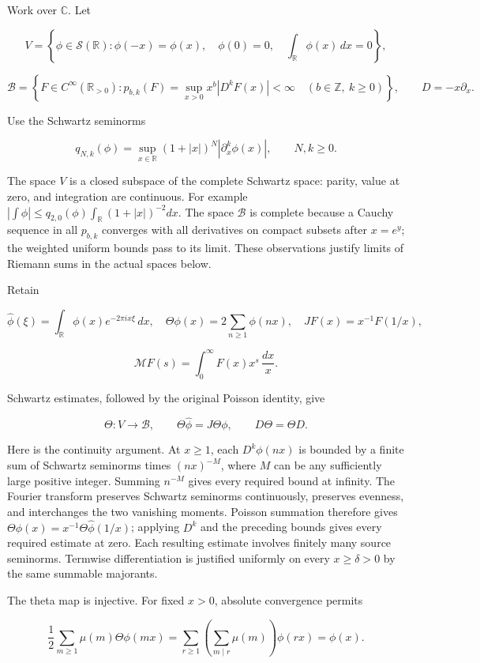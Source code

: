 \documentclass[
  11pt,
]{article}
\begin{document}
Work over \(\mathbb C\). Let

\[
V=\left\{\phi\in\mathcal S(\mathbb R):
\phi(-x)=\phi(x),\quad \phi(0)=0,\quad
\int_{\mathbb R}\phi(x)\,dx=0\right\},
\]

\[
\mathscr B=\left\{F\in C^\infty(\mathbb R_{>0}):
p_{b,k}(F)=\sup_{x>0}x^b|D^kF(x)|<\infty
\quad(b\in\mathbb Z,\ k\geq0)\right\},\qquad D=-x\partial_x.
\]

Use the Schwartz seminorms

\[q_{N,k}(\phi)=\sup_{x\in\mathbb R}(1+|x|)^N|\partial_x^k\phi(x)|,
\qquad N,k\geq0.\]

The space \(V\) is a closed subspace of the complete Schwartz space:
parity, value at zero, and integration are continuous. For example
\(|\int\phi|\leq q_{2,0}(\phi)\int_{\mathbb R}(1+|x|)^{-2}dx\). The
space \(\mathscr B\) is complete because a Cauchy sequence in all
\(p_{b,k}\) converges with all derivatives on compact subsets after
\(x=e^y\); the weighted uniform bounds pass to its limit. These
observations justify limits of Riemann sums in the actual spaces below.

Retain

\[
\widehat\phi(\xi)=\int_{\mathbb R}\phi(x)e^{-2\pi ix\xi}\,dx,
\quad \Theta\phi(x)=2\sum_{n\geq1}\phi(nx),
\quad JF(x)=x^{-1}F(1/x),
\]

\[\mathcal MF(s)=\int_0^\infty F(x)x^s\,\frac{dx}{x}.\]

Schwartz estimates, followed by the original Poisson identity, give

\[\Theta:V\longrightarrow\mathscr B,\qquad
\Theta\widehat\phi=J\Theta\phi,\qquad D\Theta=\Theta D.\]

Here is the continuity argument. At \(x\geq1\), each \(D^k\phi(nx)\) is
bounded by a finite sum of Schwartz seminorms times \((nx)^{-M}\), where
\(M\) can be any sufficiently large positive integer. Summing \(n^{-M}\)
gives every required bound at infinity. The Fourier transform preserves
Schwartz seminorms continuously, preserves evenness, and interchanges
the two vanishing moments. Poisson summation therefore gives
\(\Theta\phi(x)=x^{-1}\Theta\widehat\phi(1/x)\); applying \(D^k\) and
the preceding bounds gives every required estimate at zero. Each
resulting estimate involves finitely many source seminorms. Termwise
differentiation is justified uniformly on every \(x\geq\delta>0\) by the
same summable majorants.

The theta map is injective. For fixed \(x>0\), absolute convergence
permits

\[
\frac12\sum_{m\geq1}\mu(m)\Theta\phi(mx)
=\sum_{r\geq1}\left(\sum_{m\mid r}\mu(m)\right)\phi(rx)=\phi(x).
\]
\end{document}
